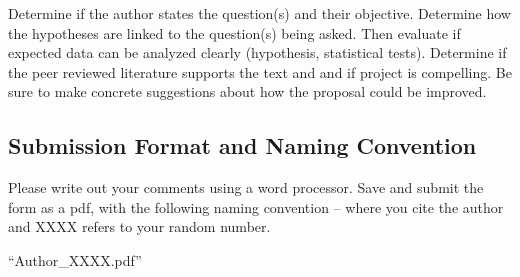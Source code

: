\documentclass{tufte-handout}\usepackage[]{graphicx}\usepackage[]{color}
\begin{document}
Determine if the author states the question(s) and their objective. Determine how the hypotheses are linked to the question(s) being asked. Then evaluate if expected data can be analyzed clearly (hypothesis, statistical tests). Determine if the peer reviewed literature supports the text and and if project is compelling. Be sure to make concrete suggestions about how the proposal could be improved. 

\subsection{Submission Format and Naming Convention}

Please write out your comments using a word processor. Save and submit the form as a pdf, with the following naming convention -- where you cite the author and XXXX refers to your random number.

\smallskip
\begin{center}
\noindent ``Author\_XXXX.pdf''
\end{center}
\bigskip



\end{document}
